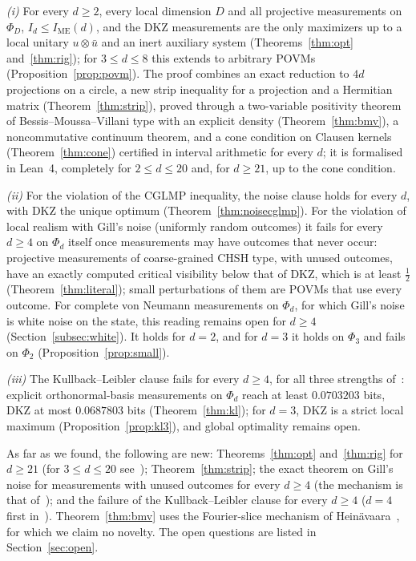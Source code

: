 \documentclass[11pt]{article}
\theoremstyle{remark}
\numberwithin{equation}{section}
\newcommand{\IME}{I_{\mathrm{ME}}}
\begin{document}
\emph{(i)} For every $d\ge2$, every local dimension $D$ and all projective measurements on $\Phi_D$, $I_d\le\IME(d)$,
and the DKZ measurements are the only maximizers up to a local unitary $u\otimes\bar u$ and an inert auxiliary system
(Theorems~\ref{thm:opt} and~\ref{thm:rig}); for $3\le d\le8$ this extends to arbitrary POVMs
(Proposition~\ref{prop:povm}). The proof combines an exact reduction to $4d$ projections on a circle, a new strip
inequality for a projection and a Hermitian matrix (Theorem~\ref{thm:strip}), proved through a two-variable positivity
theorem of Bessis--Moussa--Villani type with an explicit density (Theorem~\ref{thm:bmv}), a noncommutative continuum
theorem, and a cone condition on Clausen kernels (Theorem~\ref{thm:cone}) certified in interval arithmetic for every $d$;
it is formalised in Lean~4, completely for $2\le d\le20$ and, for $d\ge21$, up to the cone condition.

\emph{(ii)} For the violation of the CGLMP inequality, the noise clause holds for every $d$, with DKZ the unique optimum
(Theorem~\ref{thm:noisecglmp}). For the violation of local realism with Gill's noise (uniformly random outcomes) it fails
for every $d\ge4$ on $\Phi_d$ itself once measurements may have outcomes that never occur: projective measurements of
coarse-grained CHSH type, with unused outcomes, have an exactly computed critical visibility below that of DKZ, which is
at least $\frac12$ (Theorem~\ref{thm:literal}); small perturbations of them are POVMs that use every outcome. For
complete von Neumann measurements on $\Phi_d$, for which Gill's noise is white noise on the state, this reading remains
open for $d\ge4$ (Section~\ref{subsec:white}). It holds for $d=2$, and for $d=3$ it holds on $\Phi_3$ and fails on
$\Phi_2$ (Proposition~\ref{prop:small}).

\emph{(iii)} The Kullback--Leibler clause fails for every $d\ge4$, for all three strengths of~\cite{vDGG}: explicit
orthonormal-basis measurements on $\Phi_d$ reach at least $0.0703203$ bits, DKZ at most $0.0687803$ bits
(Theorem~\ref{thm:kl}); for $d=3$, DKZ is a strict local maximum (Proposition~\ref{prop:kl3}), and global optimality
remains open.

As far as we found, the following are new: Theorems~\ref{thm:opt} and~\ref{thm:rig} for $d\ge21$ (for $3\le d\le20$
see~\cite{repoCGLMP}); Theorem~\ref{thm:strip}; the exact theorem on Gill's noise for measurements with unused outcomes
for every $d\ge4$ (the mechanism is that of~\cite{ADGL}); and the failure of the Kullback--Leibler clause for every
$d\ge4$ ($d=4$ first in~\cite{Zhang}). Theorem~\ref{thm:bmv} uses the Fourier-slice mechanism of
Hein\"avaara~\cite{He}, for which we claim no novelty. The open questions are listed in Section~\ref{sec:open}.
\end{document}
